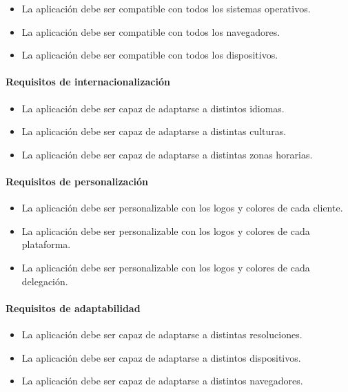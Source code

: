 \begin{itemize}
    \item La aplicación debe ser compatible con todos los sistemas operativos.
    \item La aplicación debe ser compatible con todos los navegadores.
    \item La aplicación debe ser compatible con todos los dispositivos.
\end{itemize}

\paragraph{Requisitos de internacionalización}
\label{par:analisis_requisitos_no_funcionales_internacionalizacion}

\begin{itemize}
    \item La aplicación debe ser capaz de adaptarse a distintos idiomas.
    \item La aplicación debe ser capaz de adaptarse a distintas culturas.
    \item La aplicación debe ser capaz de adaptarse a distintas zonas horarias.
\end{itemize}

\paragraph{Requisitos de personalización}
\label{par:analisis_requisitos_no_funcionales_personalizacion}

\begin{itemize}
    \item La aplicación debe ser personalizable con los logos y colores de cada cliente.
    \item La aplicación debe ser personalizable con los logos y colores de cada plataforma.
    \item La aplicación debe ser personalizable con los logos y colores de cada delegación.
\end{itemize}

\paragraph{Requisitos de adaptabilidad}
\label{par:analisis_requisitos_no_funcionales_adaptabilidad}

\begin{itemize}
    \item La aplicación debe ser capaz de adaptarse a distintas resoluciones.
    \item La aplicación debe ser capaz de adaptarse a distintos dispositivos.
    \item La aplicación debe ser capaz de adaptarse a distintos navegadores.
\end{itemize}





